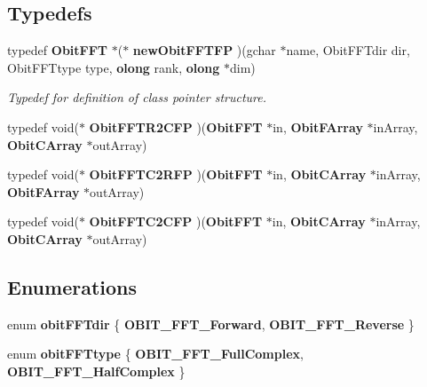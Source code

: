 \subsection*{Typedefs}
\begin{CompactItemize}
\item 
typedef {\bf Obit\-FFT} $\ast$($\ast$ {\bf new\-Obit\-FFTFP} )(gchar $\ast$name, Obit\-FFTdir dir, Obit\-FFTtype type, {\bf olong} rank, {\bf olong} $\ast$dim)
\begin{CompactList}\small\item\em Typedef for definition of class pointer structure. \item\end{CompactList}\item 
typedef void($\ast$ {\bf Obit\-FFTR2CFP} )({\bf Obit\-FFT} $\ast$in, {\bf Obit\-FArray} $\ast$in\-Array, {\bf Obit\-CArray} $\ast$out\-Array)
\item 
typedef void($\ast$ {\bf Obit\-FFTC2RFP} )({\bf Obit\-FFT} $\ast$in, {\bf Obit\-CArray} $\ast$in\-Array, {\bf Obit\-FArray} $\ast$out\-Array)
\item 
typedef void($\ast$ {\bf Obit\-FFTC2CFP} )({\bf Obit\-FFT} $\ast$in, {\bf Obit\-CArray} $\ast$in\-Array, {\bf Obit\-CArray} $\ast$out\-Array)
\end{CompactItemize}
\subsection*{Enumerations}
\begin{CompactItemize}
\item 
enum {\bf obit\-FFTdir} \{ {\bf OBIT\_\-FFT\_\-Forward}, 
{\bf OBIT\_\-FFT\_\-Reverse}
 \}
\item 
enum {\bf obit\-FFTtype} \{ {\bf OBIT\_\-FFT\_\-Full\-Complex}, 
{\bf OBIT\_\-FFT\_\-Half\-Complex}
 \}
\end{CompactItemize}
